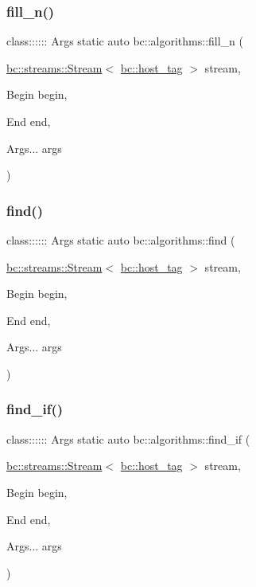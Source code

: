 \mbox{\label{namespacebc_1_1algorithms_aac60a867fc181d8dde75d4198a4f3e5d}} 
\subsubsection{\texorpdfstring{fill\+\_\+n()}{fill\_n()}}
{\footnotesize\ttfamily class\+:::::: Args static auto bc\+::algorithms\+::fill\+\_\+n (\begin{DoxyParamCaption}\item[{\hyperlink{classbc_1_1streams_1_1Stream}{bc\+::streams\+::\+Stream}$<$ \hyperlink{structbc_1_1host__tag}{bc\+::host\+\_\+tag} $>$}]{stream,  }\item[{Begin}]{begin,  }\item[{End}]{end,  }\item[{Args...}]{args }\end{DoxyParamCaption})}

\mbox{\label{namespacebc_1_1algorithms_afc2b2f65f158bc232b0245a1c1240580}} 
\subsubsection{\texorpdfstring{find()}{find()}}
{\footnotesize\ttfamily class\+:::::: Args static auto bc\+::algorithms\+::find (\begin{DoxyParamCaption}\item[{\hyperlink{classbc_1_1streams_1_1Stream}{bc\+::streams\+::\+Stream}$<$ \hyperlink{structbc_1_1host__tag}{bc\+::host\+\_\+tag} $>$}]{stream,  }\item[{Begin}]{begin,  }\item[{End}]{end,  }\item[{Args...}]{args }\end{DoxyParamCaption})}

\mbox{\label{namespacebc_1_1algorithms_a92182a82cdfb1b0a6ad3e4d4e4367404}} 
\subsubsection{\texorpdfstring{find\+\_\+if()}{find\_if()}}
{\footnotesize\ttfamily class\+:::::: Args static auto bc\+::algorithms\+::find\+\_\+if (\begin{DoxyParamCaption}\item[{\hyperlink{classbc_1_1streams_1_1Stream}{bc\+::streams\+::\+Stream}$<$ \hyperlink{structbc_1_1host__tag}{bc\+::host\+\_\+tag} $>$}]{stream,  }\item[{Begin}]{begin,  }\item[{End}]{end,  }\item[{Args...}]{args }\end{DoxyParamCaption})}

